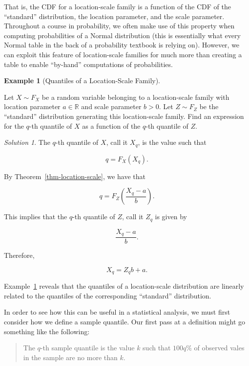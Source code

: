 \documentclass[
  letterpaper,
  DIV=11,
  numbers=noendperiod]{scrreprt}
\theoremstyle{definition}
\theoremstyle{plain}
\theoremstyle{definition}
\newtheorem{example}{Example}[chapter]
\theoremstyle{remark}
\newtheorem*{solution}{Solution}
\begin{document}
That is, the CDF for a location-scale family is a function of the CDF of
the ``standard'' distribution, the location parameter, and the scale
parameter. Throughout a course in probability, we often make use of this
property when computing probabilities of a Normal distribution (this is
essentially what every Normal table in the back of a probability
textbook is relying on). However, we can exploit this feature of
location-scale families for much more than creating a table to enable
``by-hand'' computations of probabilities.

\begin{example}[Quantiles of a Location-Scale
Family]\protect\hypertarget{exm-location-scale-quantiles}{}\label{exm-location-scale-quantiles}

Let \(X \sim F_X\) be a random variable belonging to a location-scale
family with location parameter \(a \in \mathbb{R}\) and scale parameter
\(b > 0\). Let \(Z \sim F_Z\) be the ``standard'' distribution
generating this location-scale family. Find an expression for the
\(q\)-th quantile of \(X\) as a function of the \(q\)-th quantile of
\(Z\).

\end{example}

\begin{solution}
The \(q\)-th quantile of \(X\), call it \(X_q\), is the value such that

\[q = F_X\left(X_q\right).\]

By Theorem~\ref{thm-location-scale}, we have that

\[q = F_Z\left(\frac{X_q - a}{b}\right).\]

This implies that the \(q\)-th quantile of \(Z\), call it \(Z_q\) is
given by

\[\frac{X_q - a}{b}.\]

Therefore,

\[X_q = Z_q b + a.\]
\end{solution}

Example~\ref{exm-location-scale-quantiles} reveals that the quantiles of
a location-scale distribution are linearly related to the quantiles of
the corresponding ``standard'' distribution.

In order to see how this can be useful in a statistical analysis, we
must first consider how we define a sample quantile. Our first pass at a
definition might go something like the following:

\begin{quote}
The \(q\)-th sample quantile is the value \(k\) such that \(100q\)\% of
observed vales in the sample are no more than \(k\).
\end{quote}
\end{document}
